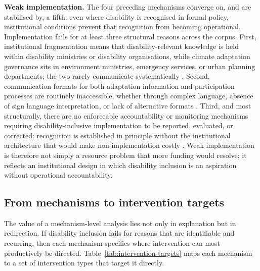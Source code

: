 \documentclass[12pt,a4paper]{article}
\begin{document}
\textbf{Weak implementation.} The four preceding mechanisms converge on, and are stabilised by, a fifth: even where disability is recognised in formal policy, institutional conditions prevent that recognition from becoming operational. Implementation fails for at least three structural reasons across the corpus. First, institutional fragmentation means that disability-relevant knowledge is held within disability ministries or disability organisations, while climate adaptation governance sits in environment ministries, emergency services, or urban planning departments; the two rarely communicate systematically \cite{devkota2023nepal,islam2015bangladesh,pertiwi2020indonesia}. Second, communication formats for both adaptation information and participation processes are routinely inaccessible, whether through complex language, absence of sign language interpretation, or lack of alternative formats \cite{lunga2019zimbabwe,gershon2021fema}. Third, and most structurally, there are no enforceable accountability or monitoring mechanisms requiring disability-inclusive implementation to be reported, evaluated, or corrected: recognition is established in principle without the institutional architecture that would make non-implementation costly \cite{Brunne2025,Jodoin2020}. Weak implementation is therefore not simply a resource problem that more funding would resolve; it reflects an institutional design in which disability inclusion is an aspiration without operational accountability.

\subsection*{From mechanisms to intervention targets}

The value of a mechanism-level analysis lies not only in explanation but in redirection. If disability inclusion fails for reasons that are identifiable and recurring, then each mechanism specifies where intervention can most productively be directed. Table~\ref{tab:intervention-targets} maps each mechanism to a set of intervention types that target it directly.
\end{document}

